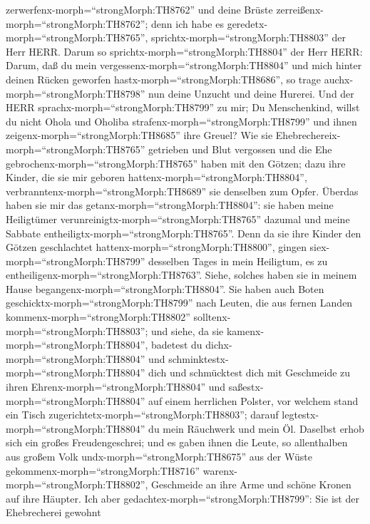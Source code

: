 zerwerfenx-morph=``strongMorph:TH8762'' und deine Brüste
zerreißenx-morph=``strongMorph:TH8762''; denn ich habe es
geredetx-morph=``strongMorph:TH8765'',
sprichtx-morph=``strongMorph:TH8803'' der Herr HERR.  Darum
so sprichtx-morph=``strongMorph:TH8804'' der Herr HERR: Darum, daß du
mein vergessenx-morph=``strongMorph:TH8804'' und mich hinter deinen
Rücken geworfen hastx-morph=``strongMorph:TH8686'', so trage
auchx-morph=``strongMorph:TH8798'' nun deine Unzucht und deine Hurerei.
 Und der HERR sprachx-morph=``strongMorph:TH8799'' zu mir;
Du Menschenkind, willst du nicht Ohola und Oholiba
strafenx-morph=``strongMorph:TH8799'' und ihnen
zeigenx-morph=``strongMorph:TH8685'' ihre Greuel?  Wie sie
Ehebrechereix-morph=``strongMorph:TH8765'' getrieben und Blut vergossen
und die Ehe gebrochenx-morph=``strongMorph:TH8765'' haben mit den
Götzen; dazu ihre Kinder, die sie mir geboren
hattenx-morph=``strongMorph:TH8804'',
verbranntenx-morph=``strongMorph:TH8689'' sie denselben zum Opfer.
 Überdas haben sie mir das
getanx-morph=``strongMorph:TH8804'': sie haben meine Heiligtümer
verunreinigtx-morph=``strongMorph:TH8765'' dazumal und meine Sabbate
entheiligtx-morph=``strongMorph:TH8765''.  Denn da sie ihre
Kinder den Götzen geschlachtet hattenx-morph=``strongMorph:TH8800'',
gingen siex-morph=``strongMorph:TH8799'' desselben Tages in mein
Heiligtum, es zu entheiligenx-morph=``strongMorph:TH8763''. Siehe,
solches haben sie in meinem Hause
begangenx-morph=``strongMorph:TH8804''.  Sie haben auch
Boten geschicktx-morph=``strongMorph:TH8799'' nach Leuten, die aus
fernen Landen kommenx-morph=``strongMorph:TH8802''
solltenx-morph=``strongMorph:TH8803''; und siehe, da sie
kamenx-morph=``strongMorph:TH8804'', badetest du
dichx-morph=``strongMorph:TH8804'' und
schminktestx-morph=``strongMorph:TH8804'' dich und schmücktest dich mit
Geschmeide zu ihren Ehrenx-morph=``strongMorph:TH8804'' 
und saßestx-morph=``strongMorph:TH8804'' auf einem herrlichen Polster,
vor welchem stand ein Tisch zugerichtetx-morph=``strongMorph:TH8803'';
darauf legtestx-morph=``strongMorph:TH8804'' du mein Räuchwerk und mein
Öl.  Daselbst erhob sich ein großes Freudengeschrei; und es
gaben ihnen die Leute, so allenthalben aus großem Volk
undx-morph=``strongMorph:TH8675'' aus der Wüste
gekommenx-morph=``strongMorph:TH8716''
warenx-morph=``strongMorph:TH8802'', Geschmeide an ihre Arme und schöne
Kronen auf ihre Häupter.  Ich aber
gedachtex-morph=``strongMorph:TH8799'': Sie ist der Ehebrecherei gewohnt
